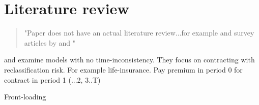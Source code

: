 \documentclass[letterpaper, 12pt]{article}
\begin{document}
\section{Literature review}


\begin{quotation}
"Paper does not have an actual literature review...for example \citet{gottlieb2008b, dellavigna2004, gottlieb2021} and survey articles by \citet{koszegi2014a} and \citet{grubb2015b}"
\end{quotation}



\cite{krueger2006a} and \citet{hendel2003a} examine models with no time-inconsistency.  They focus on contracting with reclassification risk.  For example life-insurance.  Pay premium in period 0 for contract in period 1 (...2, 3..T)

Front-loading



\printbibliography

\end{document}
